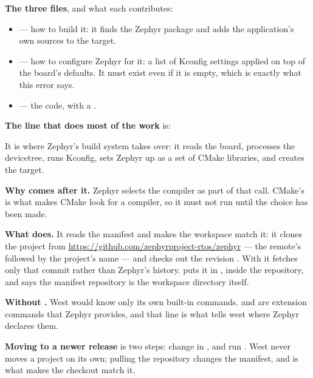 \textbf{The three files}, and what each contributes:
\begin{itemize}
  \item \textbf{} --- how to build it: it finds the Zephyr package and adds the
    application's own sources to the  target.
  \item \textbf{} --- how to configure Zephyr for it: a list of Kconfig settings
    applied on top of the board's defaults. It must exist even if it is empty, which is exactly what
    this error says.
  \item \textbf{} --- the code, with a .
\end{itemize}

\textbf{The line that does most of the work} is:


\noindent It is where Zephyr's build system takes over: it reads the board, processes the
devicetree, runs Kconfig, sets Zephyr up as a set of CMake libraries, and creates the 
target. 

\textbf{Why  comes after it.} Zephyr selects the compiler as part of that call.
CMake's  is what makes CMake look for a compiler, so it must not run until the
choice has been made. 

\textbf{What  does.} It reads the manifest and makes the workspace match it: it
clones the  project from \url{https://github.com/zephyrproject-rtos/zephyr} --- the
remote's  followed by the project's name --- and checks out the revision
. With  it fetches only that commit rather than Zephyr's history.
 puts it in , inside the repository, and
 says the manifest repository is the workspace directory itself. 

\textbf{Without .} West would know only its own built-in commands.
 and  are extension commands that Zephyr provides, and that line
is what tells west where Zephyr declares them. 

\textbf{Moving to a newer release} is two steps: change  in , and run
. West never moves a project on its own; pulling the repository changes the
manifest, and  is what makes the checkout match it. 

